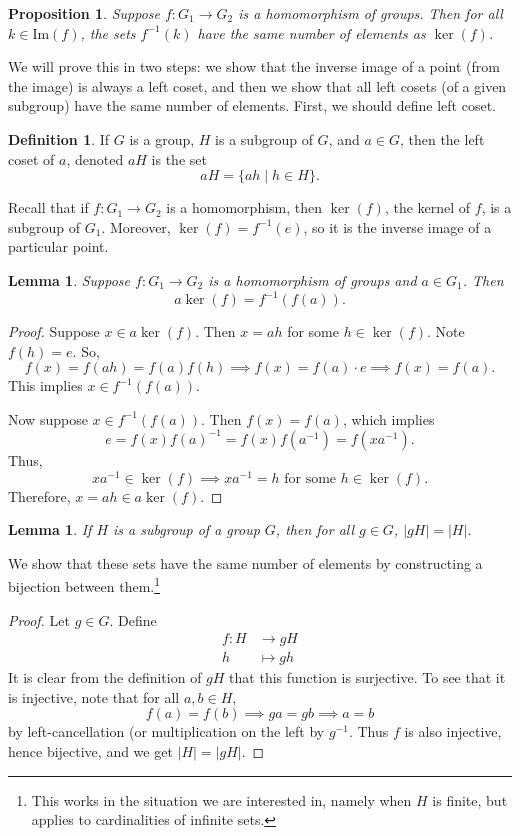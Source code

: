 \documentclass[12pt]{amsart}
\newcommand{\terminology}[1]{\textbf{\textit{#1}}}
\renewcommand{\terminology}[1]{#1}
\newcommand{\term}{\terminology}
\renewcommand{\Im}{\mathrm{Im}} %
\theoremstyle{plain}
\newtheorem{prop}[thm]{Proposition}
\newtheorem{lemma}[thm]{Lemma}
\theoremstyle{definition}
\newtheorem{defn}[thm]{Definition}
\theoremstyle{remark}
\begin{document}
\begin{prop} \label{invimgcount}
  Suppose $f:G_1\to G_2$ is a homomorphism of groups.  Then for all $k\in
  \Im(f)$, the sets $f^{-1}(k)$ have the same number of elements as
  $\ker(f)$.
\end{prop}
We will prove this in two steps: we show that the inverse image of a
point (from the image) is always a left coset, and then we show that
all left cosets (of a given subgroup) have the same number of
elements.  First, we should define left coset.
\begin{defn}
  If $G$ is a group, $H$ is a subgroup of $G$, and $a\in G$, then the
  \term{left coset} of $a$, denoted $aH$ is the set
  \[ aH=\{ah\mid h\in H\}.\]
\end{defn}
Recall that if $f:G_1\to G_2$ is a homomorphism, then $\ker(f)$, the
kernel of $f$, is a subgroup of $G_1$.  Moreover, $\ker(f) = f^{-1}(e)$,
so it is the inverse image of a particular point.
\begin{lemma}
  Suppose $f:G_1\to G_2$ is a homomorphism of groups and $a\in G_1$.  Then
  \[ a\ker(f) = f^{-1}(f(a)).\]
\end{lemma}
\begin{proof}
  Suppose $x\in a\ker(f)$.  Then $x=ah$ for some $h\in\ker(f)$.  Note
  $f(h) =e$.  So, 
\[ f(x) = f(ah) = f(a)f(h) 
     \implies f(x) = f(a)\cdot e 
     \implies f(x)= f(a). \]
This implies $x\in f^{-1}(f(a))$.  

Now suppose $x\in f^{-1}(f(a))$.  Then $f(x)=f(a)$, which implies
\[ e=f(x)f(a)^{-1} = f(x) f(a^{-1}) = f(xa^{-1}).\]
Thus, 
$$xa^{-1}\in \ker(f) \implies xa^{-1} = h \text{ for some $h\in\ker(f)$}.$$
Therefore, $x=ah\in a\ker(f)$.
\end{proof}
\begin{lemma}
  If $H$ is a subgroup of a group $G$, then for all $g\in G$, $|gH| =
  |H|$.
\end{lemma}
  We show that these sets have the same number of elements by 
  constructing a bijection between them.\footnote{This works in the situation
  we are interested in, namely when $H$ is finite, but applies to
  cardinalities of infinite sets.}
\begin{proof}
  Let $g\in G$.  Define
\begin{align*}
  f:H&\to gH \\
  h&\mapsto gh
\end{align*}
It is clear from the definition of $gH$ that this function is surjective.
To see that it is injective, note that for all $a,b\in H$,
\[  f(a) = f(b) \implies ga = gb \implies a=b\]
by left-cancellation (or multiplication on the left by $g^{-1}$.  Thus
$f$ is also injective, hence bijective, and we get $|H|=|gH|$.
\end{proof}
\end{document}
